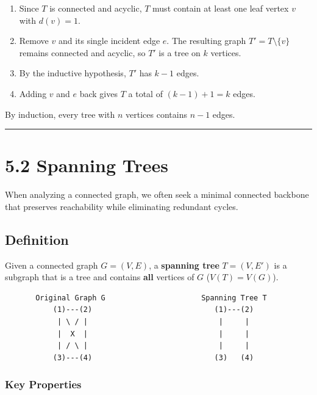 \documentclass[
]{book}
\providecommand{\tightlist}{%
  \setlength{\itemsep}{0pt}\setlength{\parskip}{0pt}}
\theoremstyle{definition}
\theoremstyle{definition}
\theoremstyle{definition}
\theoremstyle{definition}
\theoremstyle{remark}
\begin{document}
\begin{enumerate}
\def\labelenumi{\arabic{enumi}.}
\tightlist
\item
  Since \(T\) is connected and acyclic, \(T\) must contain at least one leaf vertex \(v\) with \(d(v) = 1\).
\item
  Remove \(v\) and its single incident edge \(e\). The resulting graph \(T' = T \setminus \{v\}\) remains connected and acyclic, so \(T'\) is a tree on \(k\) vertices.
\item
  By the inductive hypothesis, \(T'\) has \(k - 1\) edges.
\item
  Adding \(v\) and \(e\) back gives \(T\) a total of \((k - 1) + 1 = k\) edges.
\end{enumerate}

By induction, every tree with \(n\) vertices contains \(n - 1\) edges.

\begin{center}\rule{0.5\linewidth}{0.5pt}\end{center}

\section{5.2 Spanning Trees}\label{spanning-trees}

When analyzing a connected graph, we often seek a minimal connected backbone that preserves reachability while eliminating redundant cycles.

\subsection{Definition}\label{definition}

Given a connected graph \(G = (V, E)\), a \textbf{spanning tree} \(T = (V, E')\) is a subgraph that is a tree and contains \textbf{all} vertices of \(G\) (\(V(T) = V(G)\)).

\begin{verbatim}
       Original Graph G                      Spanning Tree T
           (1)---(2)                            (1)---(2)
            | \ / |                              |     |
            |  X  |                              |     |
            | / \ |                              |     |
           (3)---(4)                            (3)   (4)
\end{verbatim}

\subsubsection{Key Properties}\label{key-properties}
\end{document}
